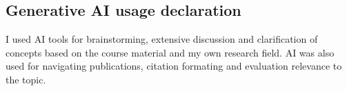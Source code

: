 \documentclass[11pt,a4paper]{article}
\begin{document}
\subsection{Generative AI usage declaration}

I used AI tools for brainstorming, extensive discussion and clarification of concepts based on the course material and my own research field. AI was also used for navigating publications, citation formating  and evaluation relevance to the topic.


\newpage




\end{document}
